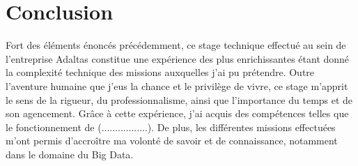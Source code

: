 \documentclass[12pt, french]{report}
\begin{document}
\chapter*{Conclusion}

Fort des éléments énoncés précédemment, ce stage technique effectué au sein de l’entreprise Adaltas constitue une expérience des plus enrichissantes étant donné la complexité technique des missions auxquelles j'ai pu prétendre. Outre l’aventure humaine que j’eus la chance et le privilège de vivre, ce stage m’apprit le sens de la rigueur, du professionnalisme, ainsi que l’importance du temps et de son agencement. Grâce à cette expérience, j’ai acquis des compétences telles que le fonctionnement de (.................). De plus, les différentes missions effectuées m’ont permis d’accroître ma volonté de savoir et de connaissance, notamment dans le domaine du Big Data.

\clearpage

\printglossaries
\end{document}

